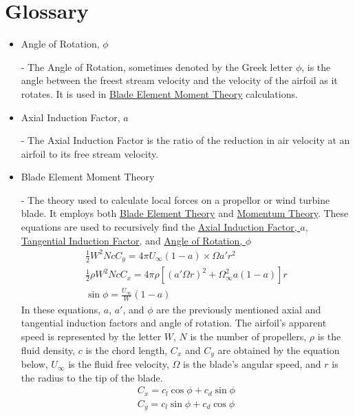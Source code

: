 \documentclass{article}
\begin{document}
\section{Glossary}
\begin{itemize}
	
	\item \hypertarget{phi}{Angle of Rotation, $\phi$} - The Angle of Rotation, sometimes denoted by the Greek letter $\phi$, is the angle between the freest stream velocity and the velocity of the airfoil as it rotates. It is used in \hyperlink{BEM}{Blade Element Moment Theory} calculations.

	\item \hypertarget{a}{Axial Induction Factor, $a$} - The Axial Induction Factor is the ratio of the reduction in air velocity at an airfoil to its free stream velocity.
	
	\item \hypertarget{BEM}{Blade Element Moment Theory} - The theory used to calculate local forces on a propellor or wind turbine blade. It employs both \hyperlink{BET}{Blade Element Theory} and \hyperlink{MT}{Momentum Theory}. These equations are used to recursively find the \hyperlink{a}{Axial Induction Factor, $a$}, \hyperlink{a'}{Tangential Induction Factor}, and \hyperlink{phi}{Angle of Rotation, $\phi$}
	\begin{equation}
	\begin{aligned}
		\frac{1}{2} W^{2} N c C_{y} = 4 \pi U_{\infty} (1 - a) \times \Omega a' r^{2} \\
		\frac{1}{2} \rho W^{2} N c C_{x} = 4 \pi \rho [(a' \Omega r)^{2} + \Omega^{2}_{\infty} a (1 - a)] r \\
		\sin \phi = \frac{U_{\infty}}{W} (1 - a)
	\end{aligned}
	\end{equation}
In these equations, $a$, $a'$, and $\phi$ are the previously mentioned axial and tangential induction factors and angle of rotation. The airfoil's apparent speed is represented by the letter $W$, $N$ is the number of propellers, $\rho$ is the fluid density, $c$ is the chord length, $C_{x}$ and $C_{y}$ are obtained by the equation below, $U_{\infty}$ is the fluid free velocity, $\Omega$ is the blade's angular speed, and $r$ is the radius to the tip of the blade.
	\begin{equation}
	\begin{aligned}
		C_{x} = c_{l} \cos{\phi} + c_{d} \sin{\phi} \\
		C_{y} = c_{l} \sin{\phi} + c_{d} \cos{\phi}
	\end{aligned}
	\end{equation}
	

\end{itemize}
\end{document}
